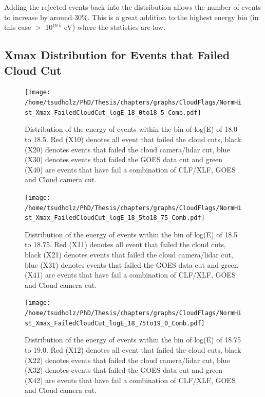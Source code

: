 Adding the rejected events back into the distribution allows the number of events to increase by around 30\%. This is a great addition to the highest energy bin (in this case $>$ 10$^{19.5}$ eV) where the statistics are low.


\subsection{Xmax Distribution for Events that Failed Cloud Cut}



\begin{figure}[!p]
\centering
\texttt{[image: /home/tsudholz/PhD/Thesis/chapters/graphs/CloudFlags/NormHist\_Xmax\_FailedCloudCut\_logE\_18\_0to18\_5\_Comb.pdf]}
\caption{Distribution of the energy of events within the bin of log(E) of 18.0 to 18.5. Red (X10) denotes all event that failed the cloud cuts, black (X20) denotes events that failed the cloud camera/lidar cut, blue (X30) denotes events that failed the GOES data cut and green (X40) are events that have fail a combination of CLF/XLF, GOES and Cloud camera cut.} \label{fig:CloudFlag_XmaxFailed_18.0}
\end{figure}

\begin{figure}[!p]
\centering
\texttt{[image: /home/tsudholz/PhD/Thesis/chapters/graphs/CloudFlags/NormHist\_Xmax\_FailedCloudCut\_logE\_18\_5to18\_75\_Comb.pdf]}
\caption{Distribution of the energy of events within the bin of log(E) of 18.5 to 18.75. Red (X11) denotes all event that failed the cloud cuts, black (X21) denotes events that failed the cloud camera/lidar cut, blue (X31) denotes events that failed the GOES data cut and green (X41) are events that have fail a combination of CLF/XLF, GOES and Cloud camera cut.} \label{fig:CloudFlag_XmaxFailed_18.5}
\end{figure}

\begin{figure}[!p]
\centering
\texttt{[image: /home/tsudholz/PhD/Thesis/chapters/graphs/CloudFlags/NormHist\_Xmax\_FailedCloudCut\_logE\_18\_75to19\_0\_Comb.pdf]}
\caption{Distribution of the energy of events within the bin of log(E) of 18.75 to 19.0. Red (X12) denotes all event that failed the cloud cuts, black (X22) denotes events that failed the cloud camera/lidar cut, blue (X32) denotes events that failed the GOES data cut and green (X42) are events that have fail a combination of CLF/XLF, GOES and Cloud camera cut.} \label{fig:CloudFlag_XmaxFailed_18.75}
\end{figure}


